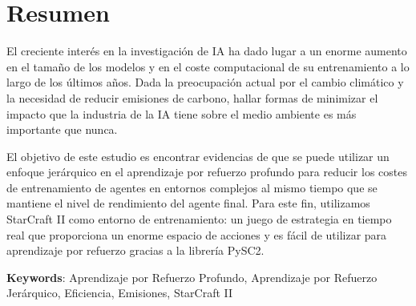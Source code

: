 \chapter*{Resumen}

El creciente interés en la investigación de IA ha dado lugar a un enorme aumento en el tamaño de los modelos y en el coste computacional de su entrenamiento a lo largo de los últimos años. Dada la preocupación actual por el cambio climático y la necesidad de reducir emisiones de carbono, hallar formas de minimizar el impacto que la industria de la IA tiene sobre el medio ambiente es más importante que nunca.

El objetivo de este estudio es encontrar evidencias de que se puede utilizar un enfoque jerárquico en el aprendizaje por refuerzo profundo para reducir los costes de entrenamiento de agentes en entornos complejos al mismo tiempo que se mantiene el nivel de rendimiento del agente final. Para este fin, utilizamos StarCraft II como entorno de entrenamiento: un juego de estrategia en tiempo real que proporciona un enorme espacio de acciones y es fácil de utilizar para aprendizaje por refuerzo gracias a la librería PySC2.

\vspace{1.5cm}

\textbf{Keywords}: Aprendizaje por Refuerzo Profundo, Aprendizaje por Refuerzo Jerárquico, Eficiencia, Emisiones, StarCraft II